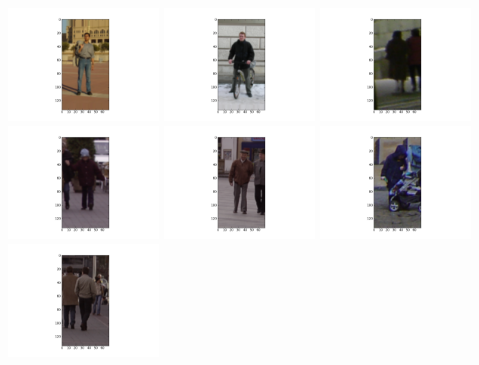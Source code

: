 \includegraphics[width=4cm]{dbshow-4-0.png} 
\includegraphics[width=4cm]{dbshow-4-1.png} 
\includegraphics[width=4cm]{dbshow-4-2.png} 
\includegraphics[width=4cm]{dbshow-4-3.png} 
\includegraphics[width=4cm]{dbshow-4-4.png} 
\includegraphics[width=4cm]{dbshow-4-5.png} 
\includegraphics[width=4cm]{dbshow-4-6.png} 
